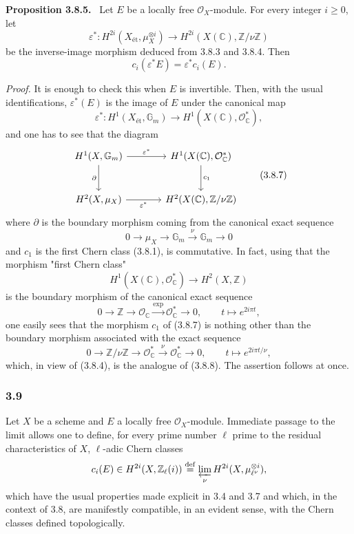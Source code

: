 \documentclass[11pt]{article}
\newenvironment{statement}[1]{\par\medskip\noindent\textbf{#1.}\ }{\par\medskip}
\begin{document}
\begin{statement}{Proposition 3.8.5}
Let $E$ be a locally free $\mathcal O_X$-module. For every integer $i\ge0$, let
\[
\varepsilon^*:H^{2i}(X_{\mathrm{ét}},\mu_X^{\otimes i})
\to H^{2i}(X(\mathbb C),\mathbb Z/\nu\mathbb Z)
\]
be the inverse-image morphism deduced from 3.8.3 and 3.8.4. Then
\[
c_i(\varepsilon^*E)=\varepsilon^*c_i(E).
\]
\end{statement}

\emph{Proof.} It is enough to check this when $E$ is invertible. Then, with the usual identifications, $\varepsilon^*(E)$ is the image of $E$ under the canonical map
\[
\varepsilon^*:H^1(X_{\mathrm{ét}},\mathbb G_m)\to H^1(X(\mathbb C),\mathcal O_\mathbb C^*),
\tag{3.8.6}
\]
and one has to see that the diagram
\[
\begin{tikzcd}[column sep=large,row sep=large]
H^1(X,\mathbb G_m) \arrow[r,"\varepsilon^*"] \arrow[d,"\partial"'] &
H^1(X(\mathbb C),\mathcal O_\mathbb C^*) \arrow[d,"c_1"]\\
H^2(X,\mu_X) \arrow[r,"\varepsilon^*"'] &
H^2(X(\mathbb C),\mathbb Z/\nu\mathbb Z)
\end{tikzcd}
\tag{3.8.7}
\]
where $\partial$ is the boundary morphism coming from the canonical exact sequence
\[
0\to \mu_X\to\mathbb G_m\xrightarrow{\nu}\mathbb G_m\to0
\tag{3.8.8}
\]
and $c_1$ is the first Chern class (3.8.1), is commutative. In fact, using that the morphism "first Chern class"
\[
H^1(X(\mathbb C),\mathcal O_\mathbb C^*)\to H^2(X,\mathbb Z)
\]
is the boundary morphism of the canonical exact sequence
\[
0\to\mathbb Z\to\mathcal O_\mathbb C\xrightarrow{\exp}\mathcal O_\mathbb C^*\to0,
\qquad
t\mapsto e^{2i\pi t},
\]
one easily sees that the morphism $c_1$ of (3.8.7) is nothing other than the boundary morphism associated with the exact sequence
\[
0\to\mathbb Z/\nu\mathbb Z\to\mathcal O_\mathbb C^*\xrightarrow{\nu}\mathcal O_\mathbb C^*\to0,
\qquad
t\mapsto e^{2i\pi t/\nu},
\]
which, in view of (3.8.4), is the analogue of (3.8.8). The assertion follows at once.

\subsubsection*{3.9}
Let $X$ be a scheme and $E$ a locally free $\mathcal O_X$-module. Immediate passage to the limit allows one to define, for every prime number $\ell$ prime to the residual characteristics of $X$, $\ell$-adic Chern classes
\[
c_i(E)\in H^{2i}(X,\mathbb Z_\ell(i))
\stackrel{\mathrm{def}}{=}\varprojlim_\nu H^{2i}(X,\mu_{\ell^\nu}^{\otimes i}),
\]
which have the usual properties made explicit in 3.4 and 3.7 and which, in the context of 3.8, are manifestly compatible, in an evident sense, with the Chern classes defined topologically.
\end{document}
